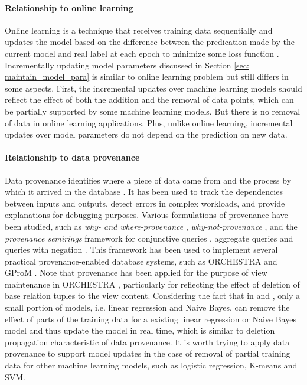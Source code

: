 \paragraph{Relationship to online learning} Online learning is a technique that receives training data sequentially and updates the model based on the difference between the predication made by the current model and real label at each epoch to minimize some loss function \cite{DBLP:journals/corr/abs-1802-02871}. Incrementally updating model parameters discussed in Section \ref{sec: maintain_model_para} is similar to online learning problem but still differs in some aspects. First, the incremental updates over machine learning models should reflect the effect of both the addition and the removal of data points, which can be partially supported by some machine learning models. But there is no removal of data in online learning applications. Plus, unlike online learning, incremental updates over model parameters do not depend on the prediction on new data. 

\paragraph{Relationship to data provenance} Data provenance identifies where a piece of data came from and the process by which it arrived in the database \cite{buneman2001and}.  It has been used to track the dependencies between inputs and outputs, detect errors in complex workloads, and provide explanations for debugging purposes. Various formulations of provenance have been studied, such as \textit{why- and where-provenance} \cite{buneman2001and}, \textit{why-not-provenance} \cite{chapman2009not}, and the \textit{provenance semirings} framework %
for conjunctive queries \cite{green2007provenance}, aggregate queries \cite{amsterdamer2011provenance} and queries with negation \cite{xu2018provenance}.  This framework has been used to implement several practical provenance-enabled database systems, such as ORCHESTRA \cite{ives2008orchestra} and GProM \cite{arab2018gprom}. Note that provenance has been applied for the purpose of view maintenance in ORCHESTRA \cite{ives2008orchestra}, particularly for reflecting the effect of deletion of base relation tuples to the view content. Considering the fact that in \cite{deshpande2006mauvedb} and \cite{gupta2015processing}, only a small portion of models, i.e. linear regression and Naive Bayes, can remove the effect of parts of the training data for a existing linear regression or Naive Bayes model and thus update the model in real time, which is similar to deletion propagation characteristic of data provenance. It is worth trying to apply data provenance to support model updates in the case of removal of partial training data for other machine learning models, such as logistic regression, K-means and SVM.



